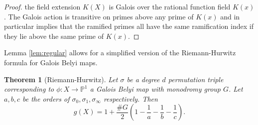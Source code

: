 \documentclass{dcthesis}
\newcommand{\PP}{\mathbb P}
\numberwithin{equation}{section}
\newtheorem{theorem}[equation]{Theorem}
\theoremstyle{definition}
\theoremstyle{remark}
\begin{document}
{{{\begin{proof}
      the field extension $K(X)$ is Galois
      over the rational function field $K(x)$.
      The Galois action is transitive on
      primes above any prime of $K(x)$
      and in particular implies that the
      ramified primes all have the same ramification
      index if they lie above the same prime
      of $K(x)$.
    \end{proof}
    Lemma \ref{lem:regular}
    allows for a simplified version of the
    Riemann-Hurwitz formula for Galois Belyi maps.
    \begin{theorem}
      [Riemann-Hurwitz]
      \label{thm:riemannhurwitzgalois}
      Let $\sigma$ be a degree $d$
      permutation triple corresponding to
      $\phi\colon X\to\PP^1$ a
      Galois Belyi map with monodromy group $G$.
      Let $a,b,c$ be the orders of
      $\sigma_0,\sigma_1,\sigma_\infty$
      respectively.
      Then
      \begin{equation}
        \label{eqn:riemannhurwitzgalois}
        g(X) = 1+\frac{\#G}{2}
        \left(1-\frac{1}{a}-\frac{1}{b}-
        \frac{1}{c}\right).
      \end{equation}
    \end{theorem}
  }
}}
\end{document}
